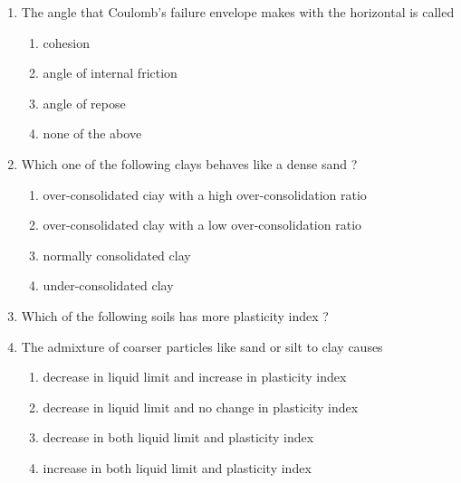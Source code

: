 \documentclass[11pt,a4paper]{article}
\begin{document}
\begin{enumerate}
{}
\\\begin{enumerate*}[itemjoin=\qquad, label=\Alph*.]
\item{15 mm}
\item{30 mm}
\item{50 mm}
\item{167 mm}
\end{enumerate*}
\item{The angle that Coulomb's failure envelope makes with the horizontal is called
}
\begin{enumerate}[label=\Alph*.]
\item{cohesion}
\item{angle of internal friction}
\item{angle of repose}
\item{none of the above}
\end{enumerate}
\item{Which one of the following clays behaves like a dense sand ?}
\begin{enumerate}[label=\Alph*.]
\item{over-consolidated ciay with a high over-consolidation ratio}
\item{over-consolidated clay with a low over-consolidation ratio}
\item{normally consolidated clay}
\item{under-consolidated clay}
\end{enumerate}
\item{Which of the following soils has more plasticity index ?}
\\
\item{The admixture of coarser particles like sand or silt to clay causes}
\begin{enumerate}[label=\Alph*.]
\item{decrease in liquid limit and increase in plasticity index}
\item{decrease in liquid limit and no change in plasticity index}
\item{decrease in both liquid limit and plasticity index}
\item{increase in both liquid limit and plasticity index}

\end{enumerate}
\end{enumerate}
\end{document}
